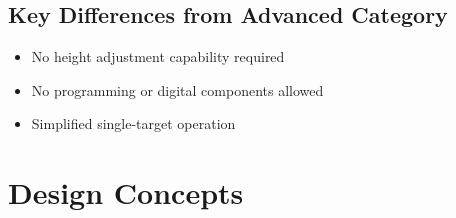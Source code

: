 \documentclass{article}
\begin{document}
\subsection*{Key Differences from Advanced Category}
\begin{itemize}[itemsep=-0.7mm]
	\item No height adjustment capability required
	\item No programming or digital components allowed
	\item Simplified single-target operation
\end{itemize}


\newpage{}
\section{Design Concepts}
\end{document}
